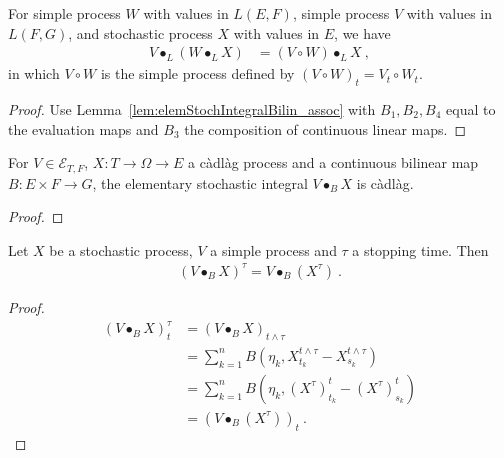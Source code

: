\begin{lemma}\label{lem:elemStochIntegralLinear_assoc}
  \leanok
For simple process $W$ with values in $L(E, F)$, simple process $V$ with values in $L(F, G)$, and stochastic process $X$ with values in $E$, we have
\begin{align*}
  V \bullet_L (W \bullet_L X)
  &= (V \circ W) \bullet_L X
  \: ,
\end{align*}
in which $V \circ W$ is the simple process defined by $(V \circ W)_t = V_t \circ W_t$.
\end{lemma}

\begin{proof}
  \leanok
Use Lemma~\ref{lem:elemStochIntegralBilin_assoc} with $B_1, B_2, B_4$ equal to the evaluation maps and $B_3$ the composition of continuous linear maps.
\end{proof}


\begin{lemma}\label{lem:cadlag_elemStochIntegralBilin}
For $V \in \mathcal{E}_{T, F}$, $X : T \to \Omega \to E$ a càdlàg process and a continuous bilinear map $B: E \times F \to G$, the elementary stochastic integral $V \bullet_B X$ is càdlàg.
\end{lemma}

\begin{proof}

\end{proof}


\begin{lemma}\label{lem:elemStochIntegral_stoppedProcess}
  \leanok
Let $X$ be a stochastic process, $V$ a simple process and $τ$ a stopping time.
Then
\begin{align*}
  (V \bullet_B X)^τ = V \bullet_B (X^τ)
  \: .
\end{align*}
\end{lemma}

\begin{proof}
  \leanok
\begin{align*}
  (V \bullet_B X)^\tau_t
  &= (V \bullet_B X)_{t \wedge \tau}
  \\
  &= \sum_{k=1}^{n} B (\eta_k, X^{t \wedge \tau}_{t_k} - X^{t \wedge \tau}_{s_k})
  \\
  &= \sum_{k=1}^{n} B (\eta_k, (X^{\tau})^t_{t_k} - (X^{\tau})^t_{s_k})
  \\
  &= (V \bullet_B (X^{\tau}))_t
  \: .
\end{align*}
\end{proof}


